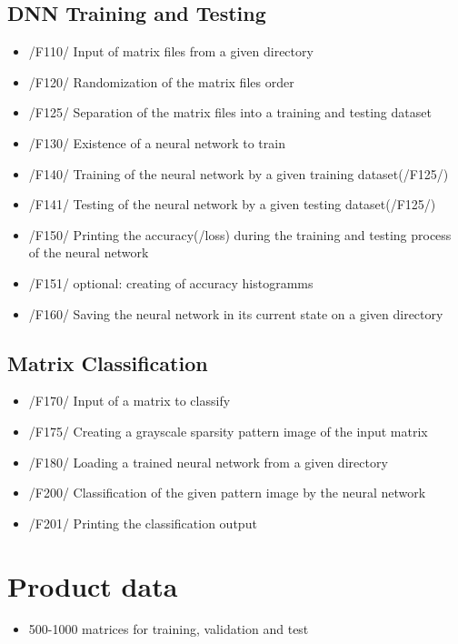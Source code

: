 \documentclass[parskip=full]{scrartcl}
\begin{document}
\subsection{DNN Training and Testing}
	\begin{itemize}
	\item /F110/ Input of matrix files from a given directory
	\item /F120/ Randomization of the matrix files order
	\item /F125/ Separation of the matrix files into a training and testing dataset
	\item /F130/ Existence of a neural network to train
	\item /F140/ Training of the neural network by a given training dataset(/F125/)
	\item /F141/ Testing of the neural network by a given testing dataset(/F125/)
	\item /F150/ Printing the accuracy(/loss) during the training and testing process of the neural network
	\item /F151/ optional: creating of accuracy histogramms
	\item /F160/ Saving the neural network in its current state on a given directory
	\end{itemize}
 	
\subsection{Matrix Classification}
	\begin{itemize}
	\item /F170/ Input of a matrix to classify
	\item /F175/ Creating a grayscale sparsity pattern image of the input matrix
	\item /F180/ Loading a trained neural network from a given directory
	\item /F200/ Classification of the given pattern image by the neural network
	\item /F201/ Printing the classification output
	\end{itemize}

\section{Product data}
	\begin{itemize}
	\item 500-1000 matrices for training, validation and test
	\end{itemize}
\end{document}
